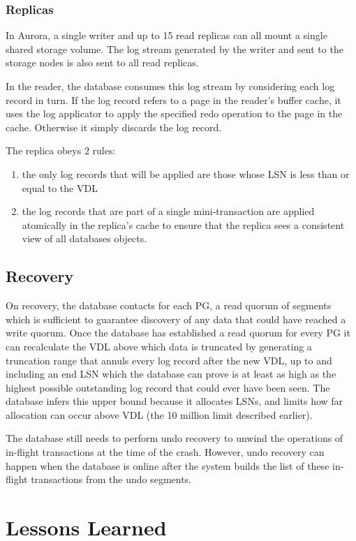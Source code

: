 \documentclass[11pt]{article}
\begin{document}
\subsubsection{Replicas}
\label{sec:orge40a1c8}
In Aurora, a single writer and up to 15 read replicas can all mount a single shared storage volume.
The log stream generated by the writer and sent to the storage nodes is also sent to all read
replicas.

In the reader, the database consumes this log stream by considering each log record in turn. If the
log record refers to a page in the reader's buffer cache, it uses the log applicator to apply the
specified redo operation to the page in the cache. Otherwise it simply discards the log record.

The replica obeys 2 rules:
\begin{enumerate}
\item the only log records that will be applied are those whose LSN is less than or equal to the VDL
\item the log records that are part of a single mini-transaction are applied atomically in the replica's
cache to ensure that the replica sees a consistent view of all databases objects.
\end{enumerate}
\subsection{Recovery}
\label{sec:org024d747}
On recovery, the database contacts for each PG, a read quorum of segments which is sufficient to
guarantee discovery of any data that could have reached a write quorum. Once the database has
established a read quorum for every PG it can recalculate the VDL above which data is truncated by
generating a truncation range that annuls every log record after the new VDL, up to and including an
end LSN which the database can prove is at least as high as the highest possible outstanding log
record that could ever have been seen. The database infers this upper bound because it allocates LSNs,
and limits how far allocation can occur above VDL (the 10 million limit described earlier).

The database still needs to perform undo recovery to unwind the operations of in-flight transactions
at the time of the crash. However, undo recovery can happen when the database is online after the
system builds the list of these in-flight transactions from the undo segments.
\section{Lessons Learned}
\label{sec:org9e71c49}
\end{document}
